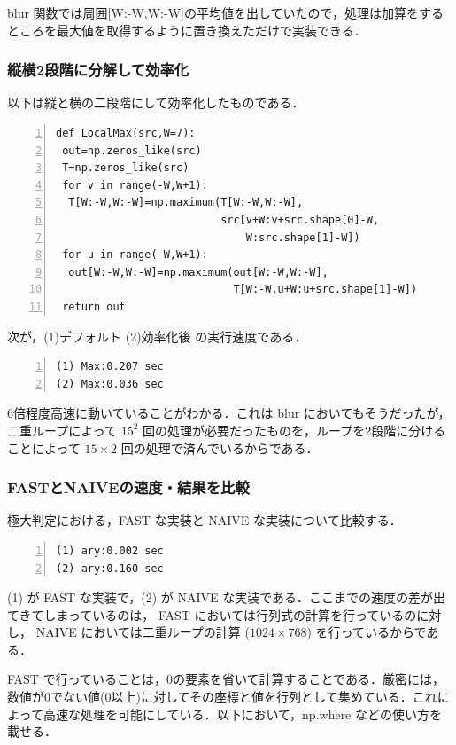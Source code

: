 \documentclass[autodetect-engine,dvi=dvipdfmx,ja=standard,
               a4j,11pt]{bxjsarticle}
\begin{document}
blur 関数では周囲[W:-W,W:-W]の平均値を出していたので，処理は加算をするところを最大値を取得するように置き換えただけで実装できる．


\subsubsection{縦横2段階に分解して効率化}
以下は縦と横の二段階にして効率化したものである．

\begin{Verbatim}[numbers=left, xleftmargin=10mm, numbersep=6pt,
                    fontsize=\small, baselinestretch=0.8]
def LocalMax(src,W=7):
 out=np.zeros_like(src)
 T=np.zeros_like(src)
 for v in range(-W,W+1):
  T[W:-W,W:-W]=np.maximum(T[W:-W,W:-W],
                          src[v+W:v+src.shape[0]-W,
                              W:src.shape[1]-W])
 for u in range(-W,W+1):
  out[W:-W,W:-W]=np.maximum(out[W:-W,W:-W],
                            T[W:-W,u+W:u+src.shape[1]-W])
 return out
\end{Verbatim}

次が，(1)デフォルト (2)効率化後 の実行速度である．

\begin{Verbatim}[numbers=left, xleftmargin=10mm, numbersep=6pt,
                    fontsize=\small, baselinestretch=0.8]
(1) Max:0.207 sec
(2) Max:0.036 sec
\end{Verbatim}

6倍程度高速に動いていることがわかる．これは blur においてもそうだったが，二重ループによって $15^2$ 回の処理が必要だったものを，ループを2段階に分けることによって $15 \times 2$ 回の処理で済んでいるからである．


\subsubsection{FASTとNAIVEの速度・結果を比較}
極大判定における，FAST な実装と NAIVE な実装について比較する．

\begin{Verbatim}[numbers=left, xleftmargin=10mm, numbersep=6pt,
                    fontsize=\small, baselinestretch=0.8]
(1) ary:0.002 sec
(2) ary:0.160 sec
\end{Verbatim}
(1) が FAST な実装で，(2) が NAIVE な実装である．ここまでの速度の差が出てきてしまっているのは， FAST においては行列式の計算を行っているのに対し， NAIVE においては二重ループの計算 ($1024 \times 768$) を行っているからである．

FAST で行っていることは，0の要素を省いて計算することである．厳密には，数値が0でない値(0以上)に対してその座標と値を行列として集めている．これによって高速な処理を可能にしている．以下において，np.where などの使い方を載せる．
\end{document}
